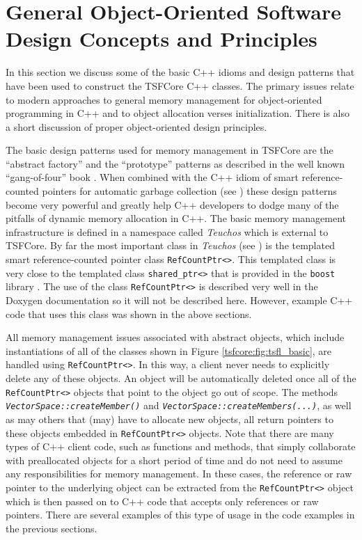 %
\section{General Object-Oriented Software Design Concepts and Principles}
\label{tsfcore:sec:general_software_concepts}
%
 
In this section we discuss some of the basic C++ idioms and design
patterns that have been used to construct the TSFCore C++ classes.
The primary issues relate to modern approaches to general memory
management for object-oriented programming in C++ and to object
allocation verses initialization.  There is also a short discussion of
proper object-oriented design principles.

The basic design patterns used for memory management in TSFCore are
the ``abstract factory'' and the ``prototype'' patterns as described
in the well known ``gang-of-four'' book {}\cite{ref:gama_et_al_1995}.
When combined with the C++ idiom of smart reference-counted pointers
for automatic garbage collection (see {}\cite[Items
28-29]{ref:meyers_1996}) these design patterns become very powerful
and greatly help C++ developers to dodge many of the pitfalls of
dynamic memory allocation in C++.  The basic memory management
infrastructure is defined in a namespace called {}\textit{Teuchos}
which is external to TSFCore.  By far the most important class in
{}\textit{Teuchos} (see {}\cite{ref:moochodevguide}) is the templated
smart reference-counted pointer class {}\texttt{RefCountPtr<>}.  This
templated class is very close to the templated class
{}\texttt{shared\_ptr<>} that is provided in the {}\texttt{boost}
library {}\cite{ref:boost}.  The use of the class
{}\texttt{RefCountPtr<>} is described very well in the Doxygen
documentation so it will not be described here.  However, example C++
code that uses this class was shown in the above sections.

All memory management issues associated with abstract objects, which
include instantiations of all of the classes shown in Figure
{}\ref{tsfcore:fig:tsfl_basic}, are handled using
{}\texttt{RefCountPtr<>}.  In this way, a client never needs to
explicitly delete any of these objects.  An object will be
automatically deleted once all of the {}\texttt{RefCountPtr<>} objects
that point to the object go out of scope.  The methods
{}\texttt{\textit{VectorSpace\-::createMember()}} and
{}\texttt{\textit{VectorSpace\-::createMembers(...)}}, as well as may
others that (may) have to allocate new objects, all return pointers to
these objects embedded in {}\texttt{RefCountPtr<>} objects.  Note that
there are many types of C++ client code, such as functions and
methods, that simply collaborate with preallocated objects for a short
period of time and do not need to assume any responsibilities for
memory management.  In these cases, the reference or raw pointer to
the underlying object can be extracted from the
{}\texttt{RefCountPtr<>} object which is then passed on to C++ code
that accepts only references or raw pointers.  There are several
examples of this type of usage in the code examples in the previous
sections.

